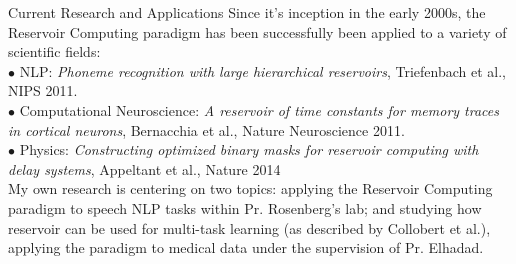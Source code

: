 \documentclass[final]{beamer}
\begin{document}
\begin{columns}[t]
\begin{column}{.45\linewidth}
\bigskip 

\begin{block}{\vspace{-13 mm} \LARGE Current Research and Applications}
\large 
Since it's inception in the early 2000s, the Reservoir Computing paradigm has been successfully been applied to a variety of scientific fields:\\
$\bullet$ NLP: {\em Phoneme recognition with large hierarchical reservoirs}, Triefenbach et al., NIPS 2011.\\
$\bullet$ Computational Neuroscience: {\em A reservoir of time constants for memory traces in cortical neurons}, Bernacchia et al., Nature Neuroscience 2011.\\
$\bullet$ Physics: {\em Constructing optimized binary masks for reservoir computing with delay systems}, Appeltant et al., Nature 2014\\
\bigskip
My own research is centering on two topics: applying the Reservoir Computing paradigm to speech NLP tasks within Pr. Rosenberg's lab; and studying how reservoir can be used for multi-task learning (as described by Collobert et al.), applying the paradigm to medical data under the supervision of Pr. Elhadad.


\end{block}

\end{column}


\end{columns}
\end{document}
